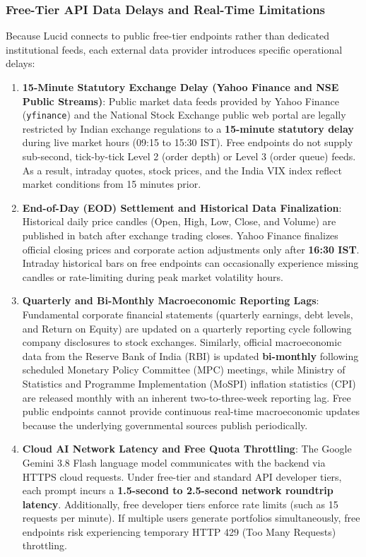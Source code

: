\subsubsection{Free-Tier API Data Delays and Real-Time Limitations}
Because Lucid connects to public free-tier endpoints rather than dedicated institutional feeds, each external data provider introduces specific operational delays:
\begin{enumerate}
    \item \textbf{15-Minute Statutory Exchange Delay (Yahoo Finance and NSE Public Streams)}: 
    Public market data feeds provided by Yahoo Finance (\texttt{yfinance}) and the National Stock Exchange public web portal are legally restricted by Indian exchange regulations to a \textbf{15-minute statutory delay} during live market hours (09:15 to 15:30 IST). Free endpoints do not supply sub-second, tick-by-tick Level 2 (order depth) or Level 3 (order queue) feeds. As a result, intraday quotes, stock prices, and the India VIX index reflect market conditions from 15 minutes prior.
    
    \item \textbf{End-of-Day (EOD) Settlement and Historical Data Finalization}: 
    Historical daily price candles (Open, High, Low, Close, and Volume) are published in batch after exchange trading closes. Yahoo Finance finalizes official closing prices and corporate action adjustments only after \textbf{16:30 IST}. Intraday historical bars on free endpoints can occasionally experience missing candles or rate-limiting during peak market volatility hours.
    
    \item \textbf{Quarterly and Bi-Monthly Macroeconomic Reporting Lags}: 
    Fundamental corporate financial statements (quarterly earnings, debt levels, and Return on Equity) are updated on a quarterly reporting cycle following company disclosures to stock exchanges. Similarly, official macroeconomic data from the Reserve Bank of India (RBI) is updated \textbf{bi-monthly} following scheduled Monetary Policy Committee (MPC) meetings, while Ministry of Statistics and Programme Implementation (MoSPI) inflation statistics (CPI) are released monthly with an inherent two-to-three-week reporting lag. Free public endpoints cannot provide continuous real-time macroeconomic updates because the underlying governmental sources publish periodically.
    
    \item \textbf{Cloud AI Network Latency and Free Quota Throttling}: 
    The Google Gemini 3.8 Flash language model communicates with the backend via HTTPS cloud requests. Under free-tier and standard API developer tiers, each prompt incurs a \textbf{1.5-second to 2.5-second network roundtrip latency}. Additionally, free developer tiers enforce rate limits (such as 15 requests per minute). If multiple users generate portfolios simultaneously, free endpoints risk experiencing temporary HTTP 429 (Too Many Requests) throttling.
\end{enumerate}


